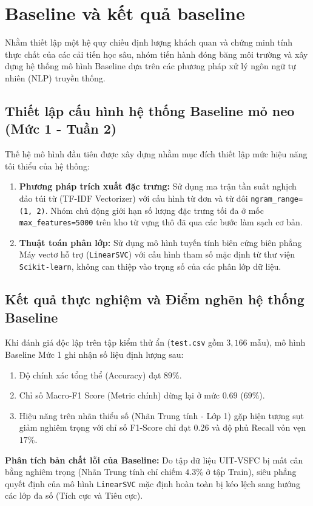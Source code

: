 \documentclass[conference,10pt,a4paper]{IEEEtran}
\begin{document}
\section{Baseline và kết quả baseline}
Nhằm thiết lập một hệ quy chiếu định lượng khách quan và chứng minh tính thực chất của các cải tiến học sâu, nhóm tiến hành đóng băng môi trường và xây dựng hệ thống mô hình Baseline dựa trên các phương pháp xử lý ngôn ngữ tự nhiên (NLP) truyền thống.

\subsection{Thiết lập cấu hình hệ thống Baseline mỏ neo (Mức 1 - Tuần 2)}
Thế hệ mô hình đầu tiên được xây dựng nhằm mục đích thiết lập mức hiệu năng tối thiểu của hệ thống:
\begin{enumerate}
    \item \textbf{Phương pháp trích xuất đặc trưng:} Sử dụng ma trận tần suất nghịch đảo túi từ (TF-IDF Vectorizer) với cấu hình từ đơn và từ đôi \texttt{ngram\_range=(1, 2)}. Nhóm chủ động giới hạn số lượng đặc trưng tối đa ở mốc \texttt{max\_features=5000} trên kho từ vựng thô đã qua các bước làm sạch cơ bản.
    \item \textbf{Thuật toán phân lớp:} Sử dụng mô hình tuyến tính biên cứng biên phẳng Máy vectơ hỗ trợ (\texttt{LinearSVC}) với cấu hình tham số mặc định từ thư viện \texttt{Scikit-learn}, không can thiệp vào trọng số của các phân lớp dữ liệu.
\end{enumerate}

\subsection{Kết quả thực nghiệm và Điểm nghẽn hệ thống Baseline}
Khi đánh giá độc lập trên tập kiểm thử ẩn (\texttt{test.csv} gồm $3,166$ mẫu), mô hình Baseline Mức 1 ghi nhận số liệu định lượng sau:
\begin{enumerate}
    \item Độ chính xác tổng thể (Accuracy) đạt $89\%$.
    \item Chỉ số Macro-F1 Score (Metric chính) dừng lại ở mức $0.69$ ($69\%$).
    \item Hiệu năng trên nhãn thiểu số (Nhãn Trung tính - Lớp 1) gặp hiện tượng sụt giảm nghiêm trọng với chỉ số F1-Score chỉ đạt $0.26$ và độ phủ Recall vỏn vẹn $17\%$.
\end{enumerate}

\noindent \textbf{Phân tích bản chất lỗi của Baseline:} Do tập dữ liệu UIT-VSFC bị mất cân bằng nghiêm trọng (Nhãn Trung tính chỉ chiếm $4.3\%$ ở tập Train), siêu phẳng quyết định của mô hình \texttt{LinearSVC} mặc định hoàn toàn bị kéo lệch sang hướng các lớp đa số (Tích cực và Tiêu cực). 
\end{document}
